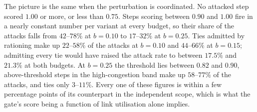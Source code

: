 The picture is the same when the perturbation is coordinated. No attacked step scored
$1.00$ or more, or less than $0.75$. Steps scoring between $0.90$ and $1.00$ fire in a
nearly constant number per variant at every budget, so their share of the attacks falls
from $42$--$78\%$ at $b = 0.10$ to $17$--$32\%$ at $b = 0.25$. Ties admitted by
rationing make up $22$--$58\%$ of the attacks at $b = 0.10$ and $44$--$66\%$ at
$b = 0.15$; admitting every tie would have raised the attack rate to between $17.5\%$
and $21.3\%$ at both budgets. At $b = 0.25$ the threshold lies between $0.82$ and
$0.90$, above-threshold steps in the high-congestion band make up $58$--$77\%$ of the
attacks, and ties only $3$--$11\%$. Every one of these figures is within a few
percentage points of its counterpart in the independent scope, which is what the gate's
score being a function of link utilisation alone implies.

